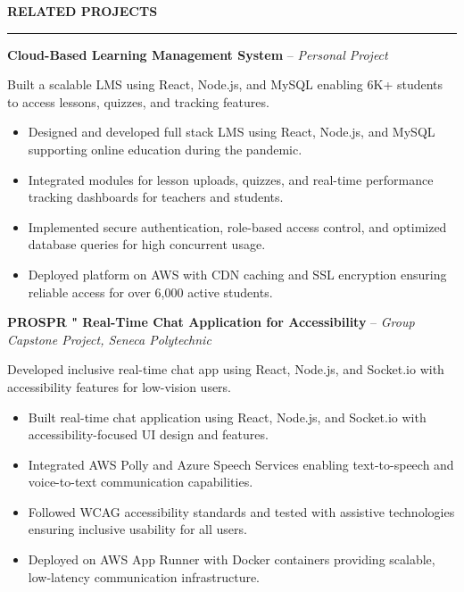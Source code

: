 \documentclass[10pt,letterpaper]{article}
\begin{document}
\vspace{6pt}

\textbf{RELATED PROJECTS}\\[-8pt]
\noindent\rule{\textwidth}{1pt}

\vspace{-2pt}

\textbf{Cloud-Based Learning Management System} -- \emph{Personal Project}

\vspace{-1pt}

Built a scalable LMS using React, Node.js, and MySQL enabling 6K+ students to access lessons, quizzes, and tracking features.
\vspace{-1pt}
\begin{itemize}
\item Designed and developed full stack LMS using React, Node.js, and MySQL supporting online education during the pandemic.
\item Integrated modules for lesson uploads, quizzes, and real-time performance tracking dashboards for teachers and students.
\item Implemented secure authentication, role-based access control, and optimized database queries for high concurrent usage.
\item Deployed platform on AWS with CDN caching and SSL encryption ensuring reliable access for over 6,000 active students.
\end{itemize}

\textbf{PROSPR " Real-Time Chat Application for Accessibility} -- \emph{Group Capstone Project, Seneca Polytechnic}

\vspace{-1pt}

Developed inclusive real-time chat app using React, Node.js, and Socket.io with accessibility features for low-vision users.
\vspace{-1pt}
\begin{itemize}
\item Built real-time chat application using React, Node.js, and Socket.io with accessibility-focused UI design and features.
\item Integrated AWS Polly and Azure Speech Services enabling text-to-speech and voice-to-text communication capabilities.
\item Followed WCAG accessibility standards and tested with assistive technologies ensuring inclusive usability for all users.
\item Deployed on AWS App Runner with Docker containers providing scalable, low-latency communication infrastructure.
\end{itemize}
\end{document}

